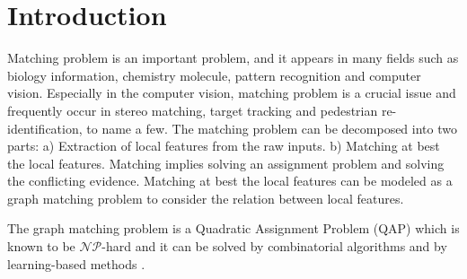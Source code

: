 \documentclass[times,onecolumn,final,authoryear]{article}
\theoremstyle{definition}
\begin{document}






\section{Introduction}

Matching problem is an important problem, and it appears in many fields such as biology information, chemistry molecule, pattern recognition and computer vision. Especially in the computer vision, matching problem is a crucial issue and frequently occur in stereo matching\cite{luo2016efficient}, target tracking\cite{yilmaz2006object} and pedestrian re-identification\cite{PRD}, to name a few. The matching problem can be decomposed into two parts: a) Extraction of local features from the raw inputs. b) Matching at best the local features. Matching implies solving an assignment problem and solving the conflicting evidence. Matching at best the local features can be modeled as a graph matching problem to consider the relation between local features. 

The graph matching problem is a Quadratic Assignment Problem (QAP) which is known to be $\mathcal{NP}$-hard \cite{GMcomplexity} and it can be solved by combinatorial algorithms \cite{conte2004thirty} and by learning-based methods \cite{caetano2009learning}.  
\end{document}
